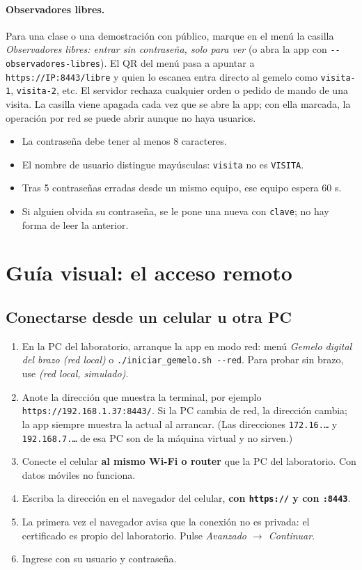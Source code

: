 \documentclass[a4paper,11pt]{article}
\newcommand{\codigo}[1]{\texttt{#1}}
\begin{document}
\paragraph{Observadores libres.} Para una clase o una demostración con público, marque en el menú la casilla \emph{Observadores libres: entrar sin contraseña, solo para ver} (o abra la app con \codigo{-{}-observadores-libres}). El QR del menú pasa a apuntar a \codigo{https://IP:8443/libre} y quien lo escanea entra directo al gemelo como \codigo{visita-1}, \codigo{visita-2}, etc. El servidor rechaza cualquier orden o pedido de mando de una visita. La casilla viene apagada cada vez que se abre la app; con ella marcada, la operación por red se puede abrir aunque no haya usuarios.


\begin{itemize}
\item La contraseña debe tener al menos 8 caracteres.
\item El nombre de usuario distingue mayúsculas: \codigo{visita} no es \codigo{VISITA}.
\item Tras 5 contraseñas erradas desde un mismo equipo, ese equipo espera 60 s.
\item Si alguien olvida su contraseña, se le pone una nueva con \codigo{clave}; no hay forma de leer la anterior.
\end{itemize}

\section{Guía visual: el acceso remoto}\label{sec:remoto}

\subsection{Conectarse desde un celular u otra PC}
\begin{enumerate}
\item En la PC del laboratorio, arranque la app en modo red: menú \emph{Gemelo digital del brazo (red local)} o \codigo{./iniciar\_gemelo.sh -{}-red}. Para probar sin brazo, use \emph{(red local, simulado)}.
\item Anote la dirección que muestra la terminal, por ejemplo \codigo{https://192.168.1.37:8443/}. Si la PC cambia de red, la dirección cambia; la app siempre muestra la actual al arrancar. (Las direcciones \codigo{172.16.\dots} y \codigo{192.168.7.\dots} de esa PC son de la máquina virtual y no sirven.)
\item Conecte el celular \textbf{al mismo Wi-Fi o router} que la PC del laboratorio. Con datos móviles no funciona.
\item Escriba la dirección en el navegador del celular, \textbf{con \codigo{https://} y con \codigo{:8443}}.
\item La primera vez el navegador avisa que la conexión no es privada: el certificado es propio del laboratorio. Pulse \emph{Avanzado $\rightarrow$ Continuar}.
\item Ingrese con su usuario y contraseña.
\end{enumerate}
\end{document}
